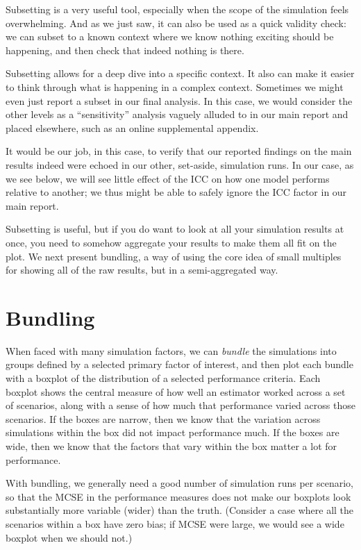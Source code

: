 \documentclass[
]{book}
\begin{document}
Subsetting is a very useful tool, especially when the scope of the simulation feels overwhelming.
And as we just saw, it can also be used as a quick validity check: we can subset to a known context where we know nothing exciting should be happening, and then check that indeed nothing is there.

Subsetting allows for a deep dive into a specific context.
It also can make it easier to think through what is happening in a complex context.
Sometimes we might even just report a subset in our final analysis.
In this case, we would consider the other levels as a ``sensitivity'' analysis vaguely alluded to in our main report and placed elsewhere, such as an online supplemental appendix.

It would be our job, in this case, to verify that our reported findings on the main results indeed were echoed in our other, set-aside, simulation runs.
In our case, as we see below, we will see little effect of the ICC on how one model performs relative to another; we thus might be able to safely ignore the ICC factor in our main report.

Subsetting is useful, but if you do want to look at all your simulation results at once, you need to somehow aggregate your results to make them all fit on the plot.
We next present bundling, a way of using the core idea of small multiples for showing all of the raw results, but in a semi-aggregated way.

\section{Bundling}\label{bundling}

When faced with many simulation factors, we can \emph{bundle} the simulations into groups defined by a selected primary factor of interest, and then plot each bundle with a boxplot of the distribution of a selected performance criteria.
Each boxplot shows the central measure of how well an estimator worked across a set of scenarios, along with a sense of how much that performance varied across those scenarios.
If the boxes are narrow, then we know that the variation across simulations within the box did not impact performance much.
If the boxes are wide, then we know that the factors that vary within the box matter a lot for performance.

With bundling, we generally need a good number of simulation runs per scenario, so that the MCSE in the performance measures does not make our boxplots look substantially more variable (wider) than the truth.
(Consider a case where all the scenarios within a box have zero bias; if MCSE were large, we would see a wide boxplot when we should not.)
\end{document}
